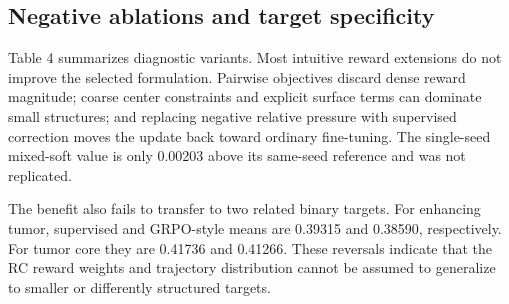 \documentclass[10pt]{article}
\begin{document}
\subsection{Negative ablations and target specificity}
Table 4 summarizes diagnostic variants. Most intuitive reward extensions do not improve the selected formulation. Pairwise objectives discard dense reward magnitude; coarse center constraints and explicit surface terms can dominate small structures; and replacing negative relative pressure with supervised correction moves the update back toward ordinary fine-tuning. The single-seed mixed-soft value is only 0.00203 above its same-seed reference and was not replicated.

\begin{table}[t]
\centering
\small
\caption{Table 4. Diagnostic RC ablations. Two-seed values are marked; all others are single-seed.}
\end{table}
The benefit also fails to transfer to two related binary targets. For enhancing tumor, supervised and GRPO-style means are 0.39315 and 0.38590, respectively. For tumor core they are 0.41736 and 0.41266. These reversals indicate that the RC reward weights and trajectory distribution cannot be assumed to generalize to smaller or differently structured targets.
\end{document}
